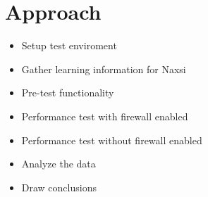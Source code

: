 \documentclass[Approach]{subfiles}
\begin{document}
\section{Approach}
\label{sec:Aproach}
\begin{itemize}
\item Setup test enviroment
\item Gather learning information for Naxsi
\item Pre-test functionality
\item Performance test with firewall enabled
\item Performance test without firewall enabled
\item Analyze the data
\item Draw conclusions
\end{itemize}
\end{document}
